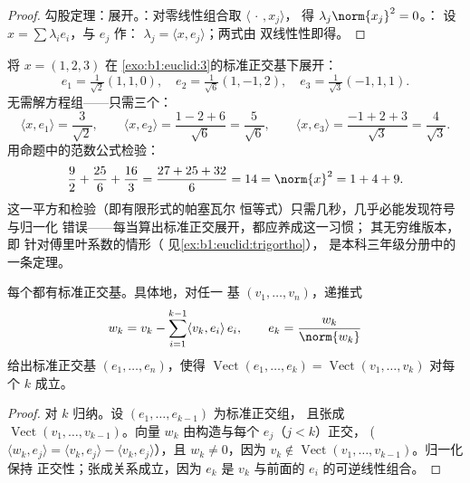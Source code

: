 \begin{proof}
勾股定理：展开。：对零线性组合取 $\langle\,\cdot\,, x_j\rangle$，
得 $\lambda_j \norm{x_j}^2 = 0$。：
设 $x = \sum \lambda_i e_i$，与 $e_j$ 作：
$\lambda_j = \langle x, e_j\rangle$；两式由
双线性性即得。
\end{proof}

\begin{example}
\label{ex:b1:euclid:parsevalcheck}
将 $x = (1, 2, 3)$ 在
\cref{exo:b1:euclid:3}的标准正交基下展开：
\[
e_1 = \tfrac{1}{\sqrt2}(1,1,0), \quad
e_2 = \tfrac{1}{\sqrt6}(1,-1,2), \quad
e_3 = \tfrac{1}{\sqrt3}(-1,1,1).
\]
无需解方程组——只需三个：
\[
\langle x, e_1\rangle = \frac{3}{\sqrt2},
\qquad
\langle x, e_2\rangle = \frac{1 - 2 + 6}{\sqrt6} =
\frac{5}{\sqrt6},
\qquad
\langle x, e_3\rangle = \frac{-1 + 2 + 3}{\sqrt3} =
\frac{4}{\sqrt3}.
\]
用命题中的范数公式检验：
\[
\frac{9}{2} + \frac{25}{6} + \frac{16}{3}
= \frac{27 + 25 + 32}{6} = 14 = \norm{x}^2 = 1 + 4 + 9 .
\]
这一平方和检验（即有限形式的帕塞瓦尔
恒等式）只需几秒，几乎必能发现符号与归一化
错误——每当算出标准正交展开，都应养成这一习惯；
其无穷维版本，即
针对傅里叶系数的情形（
见\cref{ex:b1:euclid:trigortho}），
是本科三年级分册中的一条定理。
\end{example}

\begin{theorem}\label{thm:b1:euclid:gramschmidt}
每个都有标准正交基。具体地，对任一
基 $(v_1, \dots, v_n)$，递推式
\[
w_k = v_k - \sum_{i=1}^{k-1} \langle v_k, e_i\rangle\, e_i ,
\qquad
e_k = \frac{w_k}{\norm{w_k}}
\]
给出标准正交基 $(e_1, \dots, e_n)$，使得
$\operatorname{Vect}(e_1, \dots, e_k) = \operatorname{Vect}(v_1,
\dots, v_k)$ 对每个 $k$ 成立。
\end{theorem}

\begin{proof}
对 $k$ 归纳。设 $(e_1, \dots, e_{k-1})$ 为标准正交组，
且张成 $\operatorname{Vect}(v_1, \dots, v_{k-1})$。向量
$w_k$ 由构造与每个 $e_j$（$j < k$）正交，
($\langle w_k, e_j \rangle = \langle v_k, e_j\rangle - \langle v_k,
e_j\rangle$），且 $w_k \neq 0$，因为 $v_k \notin
\operatorname{Vect}(v_1, \dots, v_{k-1})$。归一化保持
正交性；张成关系成立，因为 $e_k$ 是
$v_k$ 与前面的 $e_i$ 的可逆线性组合。
\end{proof}

